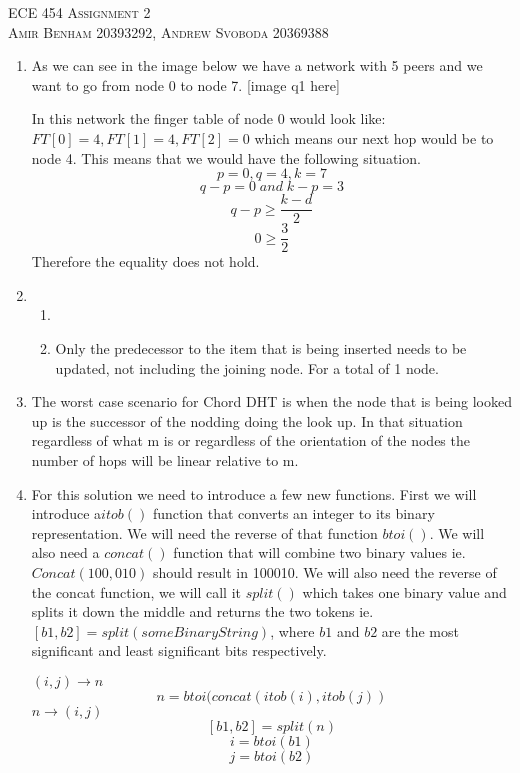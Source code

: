 \documentclass{article}
\begin{document}
\begin{center}
\textsc{\Large ECE 454 Assignment 2}\\[0.5cm]
\textsc{Amir Benham 20393292, Andrew Svoboda 20369388}\\[0.5cm]
\end{center}

\begin{enumerate}

	\item As we can see in the image below we have a network with 5 peers and we want to go from node 0 to node 7.
		[image q1 here]
	
	In this network the finger table of node 0 would look like: \(FT[0]=4, FT[1]=4, FT[2]=0\) which means our next hop would be to node 4. This means that we would have the following situation.
\[
p=0, q=4 , k=7
\]
\[
q-p=0 \; and\;  k-p=3
\]
\[
q-p \ge \frac{k-d}{2}
\]
\[
0\ge \frac{3}{2}
\]
Therefore the equality does not hold.

\item
 \begin{enumerate}
	\item
	\item Only the predecessor to the item that is being inserted needs to be updated, not including the joining node. For a total of 1 node.
\end{enumerate}

\item The worst case scenario for Chord DHT is when the node that is being looked up is the successor of the nodding doing the look up. In that situation regardless of what m is or regardless of the orientation of the nodes the number of hops will be linear relative to m. 

\item For this solution we need to introduce a few new functions. First we will introduce a\( itob()\) function that converts an integer to its binary representation. We will need the reverse of that function \(btoi()\). We will also need a \(concat()\) function that will combine two binary values ie. \(Concat(100,010)\) should result in 100010.  We will also need the reverse of the concat function, we will call it \(split()\) which takes one binary value and splits it down the middle and returns the two tokens ie. \([b1,b2]=split(someBinaryString)\), where \( b1\) and \(b2\) are the most significant and least significant bits respectively.

\((i,j)\rightarrow n\)
\[
n=btoi(concat(itob(i),itob(j))
\]
\(n\rightarrow(i,j)\)
\[
[b1,b2]=split(n)
\]
\[
i=btoi(b1)
\]
\[
j=btoi(b2)
\]
	

\end{enumerate}
\end{document}
